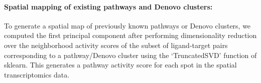 \paragraph{Spatial mapping of existing pathways and Denovo clusters:}
To generate a spatial map of previously known pathways or Denovo clusters, we computed the first principal component after performing dimensionality reduction over the neighborhood activity scores of the subset of ligand-target pairs corresponding to a pathway/Denovo cluster using the `TruncatedSVD' function of sklearn. This generates a pathway activity score for each spot in the spatial transcriptomics data. 


